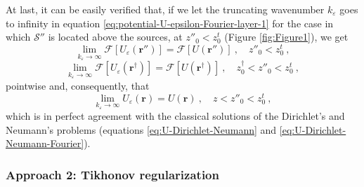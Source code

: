 At last, it can be easily verified that, if we let the truncating wavenumber $k_{\varepsilon}$ 
goes to infinity in equation \ref{eq:potential-U-epsilon-Fourier-layer-1} for the case in which 
$\mathcal{S}''$ is located above the sources, at $z''_{0} < z^{t}_{0}$ (Figure \ref{fig:Figure1}), 
we get 
\begin{equation}
	\lim_{k_{\varepsilon}\to\infty} \mathcal{F} \left[ U_{\varepsilon}(\mathbf{r}'') \right] = 
	\mathcal{F} \left[ U(\mathbf{r}'') \right] \: , \quad z''_{0} < z^{t}_{0} \: ,
	\label{eq:lim-kepsilon-potential-U-epsilon-Fourier-layer}
\end{equation}
\begin{equation}
	\lim_{k_{\varepsilon}\to\infty} \mathcal{F} \left[ U_{\varepsilon}(\mathbf{r}^{\dagger}) \right] = 
	\mathcal{F} \left[ U(\mathbf{r}^{\dagger}) \right] \: , \quad z^{\dagger}_{0} < z''_{0} < z^{t}_{0} \: ,
	\label{eq:lim-kepsilon-potential-U-epsilon-Fourier-dagger}
\end{equation}
pointwise and, consequently, that
\begin{equation}
	\lim_{k_{\varepsilon}\to\infty} U_{\varepsilon}(\mathbf{r}) = 
	U(\mathbf{r}) \: , \quad z < z''_{0} < z^{t}_{0} \: ,
	\label{eq:lim-kepsilon-potential-U-epsilon-space}
\end{equation}
which is in perfect agreement with the classical solutions of the Dirichlet's and Neumann's
problems (equations \ref{eq:U-Dirichlet-Neumann} and \ref{eq:U-Dirichlet-Neumann-Fourier}).

\subsubsection{Approach 2: Tikhonov regularization}

